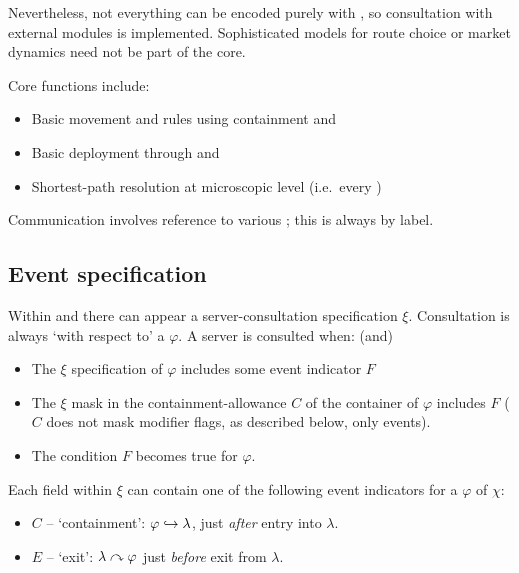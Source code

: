 Nevertheless, not everything can be encoded purely with , so
consultation with external modules is implemented.
Sophisticated models for route choice or market
dynamics need not be part of the core.

Core functions include:
\begin{itemize}
\item Basic  movement and rules using containment and 
\item Basic  deployment through  and 
\item Shortest-path resolution at microscopic level (i.e.~every )
\end{itemize}

Communication involves reference to various ; this is always by label.

\subsection{Event specification}

Within  and  there can appear a server-consultation specification $\xi$.
Consultation is always `with respect to' a 
$\varphi$.  A server is consulted when: (and)
\begin{itemize}
  \item The $\xi$ specification of $\varphi$ includes some event indicator $F$
  \item The $\xi$ mask in the containment-allowance $C$ of the container of $\varphi$ includes $F$
    ($C$ does not mask modifier flags, as described below, only events).
  \item The condition $F$ becomes true for $\varphi$.
\end{itemize}

Each field within $\xi$ can contain one of the following event indicators for a  $\varphi$ of  $\chi$:
\begin{itemize}
\item $C$ -- `containment': ${\varphi} \hookrightarrow {\lambda}$, just \emph{after} entry into $\lambda$.
\item $E$ -- `exit':  ${\lambda} \curvearrowright {\varphi}$ just \emph{before} exit from $\lambda$.
\end{itemize}

